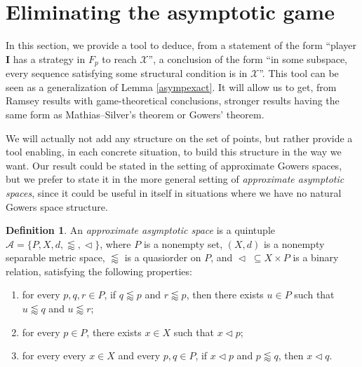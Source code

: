 \documentclass[a4paper,11pt]{article}
\theoremstyle{definition}
\newtheorem{defin}[thm]{Definition}
\numberwithin{equation}{section}
\newcommand{\X}{\mathcal{X}}
\newcommand{\I}{\textbf{I}}
\newcommand{\A}{\mathcal{A}}
\begin{document}
\bigskip\bigskip

\section{Eliminating the asymptotic game}\label{par5}

In this section, we provide a tool to deduce, from a statement of the form ``player \I{} has a strategy in $F_p$ to reach $\X$'', a conclusion of the form ``in some subspace, every sequence satisfying some structural condition is in $\X$''. This tool can be seen as a generalization of Lemma \ref{asympexact}. It will allow us to get, from Ramsey results with game-theoretical conclusions, stronger results having the same form as Mathias--Silver's theorem or Gowers' theorem.

\smallskip

We will actually not add any structure on the set of points, but rather provide a tool enabling, in each concrete situation, to build this structure in the way we want. Our result could be stated in the setting of approximate Gowers spaces, but we prefer to state it in the more general setting of \emph{approximate asymptotic spaces}, since it could be useful in itself in situations where we have no natural Gowers space structure.

\smallskip

\begin{defin}

An \emph{approximate asymptotic space} is a quintuple $\A = \{P, X, d, \lessapprox, \vartriangleleft\}$, where $P$ is a nonempty set, $(X, d)$ is a nonempty separable metric space, $\lessapprox$ is a quasiorder on $P$, and $\vartriangleleft \; \subseteq X \times P$ is a binary relation, satisfying the following properties:

\begin{enumerate}

\item for every $p, q, r \in P$, if $q \lessapprox p$ and $r \lessapprox p$, then there exists $u \in P$ such that $u \lessapprox q$ and $u \lessapprox r$;

\item for every $p \in P$, there exists $x \in X$ such that $x \vartriangleleft p$;

\item for every every $x \in X$ and every $p, q \in P$, if $x \vartriangleleft p$ and $p \lessapprox q$, then $x \vartriangleleft q$.

\end{enumerate}

\end{defin}
\end{document}
